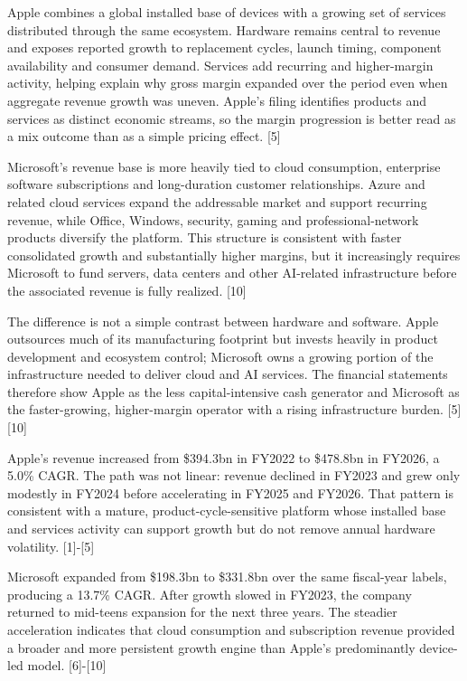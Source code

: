 \documentclass[10pt]{article}
\begin{document}
\newpage
{}\noindent Apple combines a global installed base of devices with a growing set of services distributed through the same ecosystem. Hardware remains central to revenue and exposes reported growth to replacement cycles, launch timing, component availability and consumer demand. Services add recurring and higher-margin activity, helping explain why gross margin expanded over the period even when aggregate revenue growth was uneven. Apple's filing identifies products and services as distinct economic streams, so the margin progression is better read as a mix outcome than as a simple pricing effect. [5]\par
\noindent Microsoft's revenue base is more heavily tied to cloud consumption, enterprise software subscriptions and long-duration customer relationships. Azure and related cloud services expand the addressable market and support recurring revenue, while Office, Windows, security, gaming and professional-network products diversify the platform. This structure is consistent with faster consolidated growth and substantially higher margins, but it increasingly requires Microsoft to fund servers, data centers and other AI-related infrastructure before the associated revenue is fully realized. [10]\par
\noindent The difference is not a simple contrast between hardware and software. Apple outsources much of its manufacturing footprint but invests heavily in product development and ecosystem control; Microsoft owns a growing portion of the infrastructure needed to deliver cloud and AI services. The financial statements therefore show Apple as the less capital-intensive cash generator and Microsoft as the faster-growing, higher-margin operator with a rising infrastructure burden. [5][10]\par
\newpage
{}\noindent Apple's revenue increased from \$394.3bn in FY2022 to \$478.8bn in FY2026, a 5.0\% CAGR. The path was not linear: revenue declined in FY2023 and grew only modestly in FY2024 before accelerating in FY2025 and FY2026. That pattern is consistent with a mature, product-cycle-sensitive platform whose installed base and services activity can support growth but do not remove annual hardware volatility. [1]-[5]\par
\noindent Microsoft expanded from \$198.3bn to \$331.8bn over the same fiscal-year labels, producing a 13.7\% CAGR. After growth slowed in FY2023, the company returned to mid-teens expansion for the next three years. The steadier acceleration indicates that cloud consumption and subscription revenue provided a broader and more persistent growth engine than Apple's predominantly device-led model. [6]-[10]\par
\end{document}
